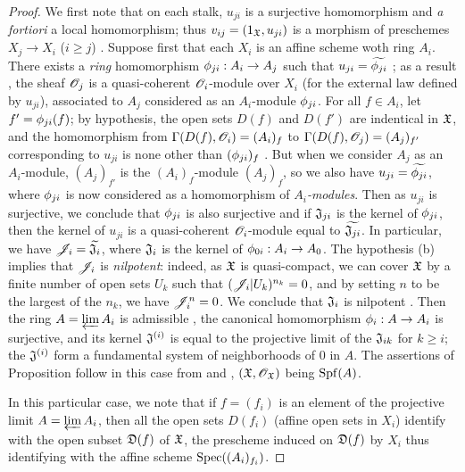 \begin{proof}
\label{proof-1.10.6.3}
We first note that on each stalk, $u_{ji}$ is a surjective homomorphism and \emph{a fortiori} a local homomorphism; thus $v_{ij}=(1_\mathfrak{X},u_{ji})$ is a morphism of preschemes $X_j\to X_i$ ($i\geqslant j$) .
Suppose first that each $X_i$ is an affine scheme woth ring $A_i$.
There exists a \emph{ring} homomorphism $\vphi_{ji}:A_i\to A_j$ such that $u_{ji}=\widetilde{\phi_{ji}}$ ; as a result , the sheaf $\mathscr{O}_j$ is a quasi-coherent $\mathscr{O}_i$-module over $X_i$ (for the external law defined by $u_{ji}$), associated to $A_j$ considered as an $A_i$-module $\phi_{ji}$.
For all $f\in A_i$, let $f'=\phi_{ji}(f)$; by hypothesis, the open sets $D(f)$ and $D(f')$ are indentical in $\mathfrak{X}$, and the homomorphism from $\Gamma(D(f),\mathscr{O}_i)=(A_i)_f$ to $\Gamma(D(f),\mathscr{O}_j)=(A_j)_{f'}$ corresponding to $u_{ji}$ is none other than $(\phi_{ji})_f$ .
But when we consider $A_j$ as an $A_i$-module, $(A_j)_{f'}$ is the $(A_i)_f$-module $(A_j)_f$, so we also have $u_{ji}=\widetilde{\phi_{ji}}$, where $\phi_{ji}$ is now considered as a homomorphism of \emph{$A_i$-modules}.
Then as $u_{ji}$ is surjective, we conclude that $\phi_{ji}$ is also surjective  and if $\mathfrak{J}_{ji}$ is the kernel of $\phi_{ji}$, then the kernel of $u_{ji}$ is a quasi-coherent $\mathscr{O}_i$-module equal to $\widetilde{\mathfrak{J}_{ji}}$.
In particular, we have $\mathscr{J}_i=\widetilde{\mathfrak{J}_i}$, where $\mathfrak{J}_i$ is the kernel of $\vphi_{0i}:A_i\to A_0$.
The hypothesis (b) implies that $\mathscr{J}_i$ is \emph{nilpotent}: indeed, as $\mathfrak{X}$ is quasi-compact, we can cover $\mathfrak{X}$ by a finite number of open sets $U_k$ such that $(\mathscr{J}_i|U_k)^{n_k}=0$, and by setting $n$ to be the largest of the $n_k$, we have $\mathscr{J}_i^n=0$.
We conclude that $\mathfrak{J}_i$ is nilpotent .
Then the ring $A=\varprojlim A_i$ is admissible , the canonical homomorphism $\vphi_i:A\to A_i$ is surjective, and its kernel $\mathfrak{J}^{(i)}$ is equal to the projective limit of the $\mathfrak{J}_{ik}$ for $k\geqslant i$; the $\mathfrak{J}^{(i)}$ form a fundamental system of neighborhoods of $0$ in $A$.
The assertions of Proposition  follow in this case from  and , $(\mathfrak{X},\mathscr{O}_\mathfrak{X})$ being ${\mathop{\mathrm{Spf}}\nolimits}(A)$.

In this particular case, we note that if $f=(f_i)$ is an element of the projective limit $A=\varprojlim A_i$, then all the open sets $D(f_i)$ (affine open sets in $X_i$) identify with the open subset $\mathfrak{D}(f)$ of $\mathfrak{X}$, the prescheme induced on $\mathfrak{D}(f)$ by $X_i$ thus identifying with the affine scheme ${\mathop{\mathrm{Spec}}\nolimits}((A_i)_{f_i})$.


\end{proof}
